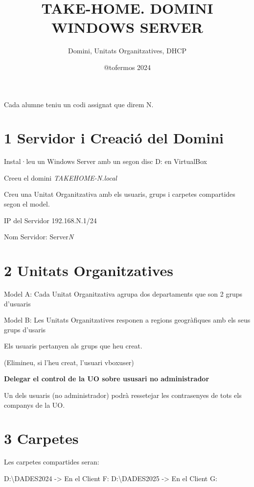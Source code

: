 \documentclass[
  a4paper,
]{article}
\title{TAKE-HOME. DOMINI WINDOWS SERVER}
\subtitle{Domini, Unitats Organitzatives, DHCP}
\author{@tofermos 2024}
\date{}
\begin{document}
\maketitle

{
\setcounter{tocdepth}{2}
\tableofcontents
}
\newpage
\renewcommand\tablename{Tabla}

Cada alumne teniu un codi assignat que direm N.

\section{1 Servidor i Creació del
Domini}\label{servidor-i-creaciuxf3-del-domini}

Instal·leu un Windows Server amb un segon disc D: en VirtualBox

Creeu el domini \emph{TAKEHOME-N.local}

Creu una Unitat Organitzativa amb els usuaris, grups i carpetes
compartides segon el model.

IP del Servidor 192.168.N.1/24

Nom Servidor: Server\emph{N}

\section{2 Unitats Organitzatives}\label{unitats-organitzatives}

Model A: Cada Unitat Organitzativa agrupa dos departaments que son 2
grups d'usuaris

Model B: Les Unitats Organitzatives responen a regions geogràfiques amb
els seus grups d'usaris

Els usuaris pertanyen als grups que heu creat.

(Elimineu, si l'heu creat, l'usuari vboxuser)

\textbf{Delegar el control de la UO sobre ususari no administrador}

Un dels usuaris (no administrador) podrà ressetejar les contrasenyes de
tots els companys de la UO.

\section{3 Carpetes}\label{carpetes}

Les carpetes compartides seran:

D:\textbackslash DADES2024 -\textgreater{} En el Client F:
D:\textbackslash DADES2025 -\textgreater{} En el Client G:
\end{document}
